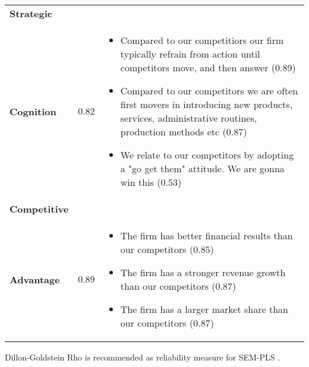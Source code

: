 \documentclass[review,fleqn]{elsarticle}\usepackage[]{graphicx}\usepackage[]{color}
\begin{document}
\begin{table}[h]
\begin{tabular}{p{2cm} c p{9cm}}
   \textbf{Strategic} \\ \textbf{Cognition} & \textbf{$0.82$} & \vspace{-5mm} 
                                                               \begin{itemize} \setlength\itemsep{-0.2em} 
                                                               \item Compared to our competitiors our firm typically refrain from action until competitors move, and then answer ($0.89$)
                                                               \item Compared to our competitors we are often first movers in introducing new products, services, administrative routines, production methods etc ($0.87$)
                                                               \item We relate to our competitors by adopting a "go get them" attitude. We are gonna win this ($0.53$)
                                                               \end{itemize} \\  \midrule%
  
   \textbf{Competitive} \\ \textbf{Advantage} & \textbf{$0.89$} & \vspace{-5mm} 
                                                               \begin{itemize} \setlength\itemsep{-0.2em} 
                                                               \item The firm has better financial results than our competitors ($0.85$)
                                                               \item The firm has a stronger revenue growth than our competitors ($0.87$)
                                                               \item The firm has a larger market share than our competitors ($0.87$)
                                                               \end{itemize} \\  \bottomrule%
  
\end{tabular}
    \begin{tablenotes}
      \tiny
      \item Dillon-Goldstein Rho is recommended as reliability measure
        for SEM-PLS \citep{Hair2019}.
    \end{tablenotes}
  \end{table}
\end{document}
